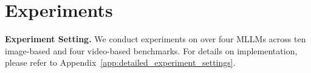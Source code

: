 
\section{Experiments}
\vspace{-0.1cm}
\noindent\textbf{Experiment Setting.} We conduct experiments on over four MLLMs across ten image-based and four video-based benchmarks. For details on implementation, please refer to Appendix~\ref{app:detailed_experiment_settings}.




